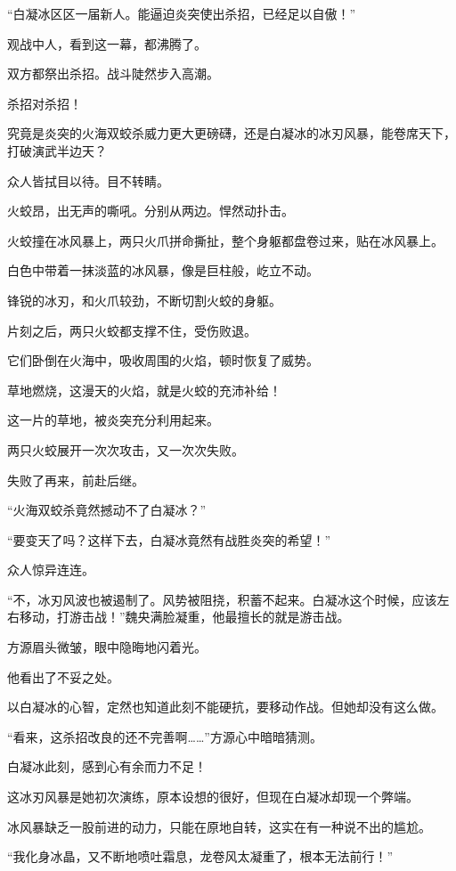 \begin{this_body}
“白凝冰区区一届新人。能逼迫炎突使出杀招，已经足以自傲！”

观战中人，看到这一幕，都沸腾了。

双方都祭出杀招。战斗陡然步入高潮。

杀招对杀招！

究竟是炎突的火海双蛟杀威力更大更磅礴，还是白凝冰的冰刃风暴，能卷席天下，打破演武半边天？

众人皆拭目以待。目不转睛。

火蛟昂，出无声的嘶吼。分别从两边。悍然动扑击。

火蛟撞在冰风暴上，两只火爪拼命撕扯，整个身躯都盘卷过来，贴在冰风暴上。

白色中带着一抹淡蓝的冰风暴，像是巨柱般，屹立不动。

锋锐的冰刃，和火爪较劲，不断切割火蛟的身躯。

片刻之后，两只火蛟都支撑不住，受伤败退。

它们卧倒在火海中，吸收周围的火焰，顿时恢复了威势。

草地燃烧，这漫天的火焰，就是火蛟的充沛补给！

这一片的草地，被炎突充分利用起来。

两只火蛟展开一次次攻击，又一次次失败。

失败了再来，前赴后继。

“火海双蛟杀竟然撼动不了白凝冰？”

“要变天了吗？这样下去，白凝冰竟然有战胜炎突的希望！”

众人惊异连连。

“不，冰刃风波也被遏制了。风势被阻挠，积蓄不起来。白凝冰这个时候，应该左右移动，打游击战！”魏央满脸凝重，他最擅长的就是游击战。

方源眉头微皱，眼中隐晦地闪着光。

他看出了不妥之处。

以白凝冰的心智，定然也知道此刻不能硬抗，要移动作战。但她却没有这么做。

“看来，这杀招改良的还不完善啊……”方源心中暗暗猜测。

白凝冰此刻，感到心有余而力不足！

这冰刃风暴是她初次演练，原本设想的很好，但现在白凝冰却现一个弊端。

冰风暴缺乏一股前进的动力，只能在原地自转，这实在有一种说不出的尴尬。

“我化身冰晶，又不断地喷吐霜息，龙卷风太凝重了，根本无法前行！”


\end{this_body}
